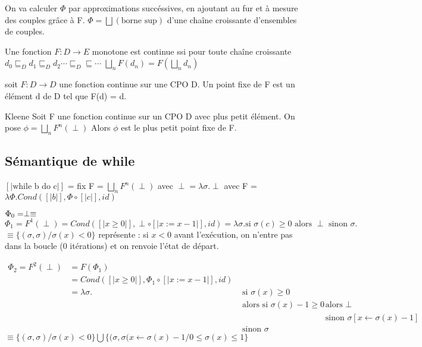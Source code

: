 \documentclass[10pt,a4paper]{article}
\newcommand{\sem}[1]{$\left[| #1 | \right]$}
\newcommand{\semm}[1]{\left[| #1 | \right]}
\begin{document}
On va calculer $\Phi$ par approximations succéssives, en ajoutant au fur et à mesure des couples grâce à F.
$\Phi = \bigsqcup (\text{borne sup})$ d'une chaîne croissante d'ensembles de couples.

\begin{definition}{} Une fonction $F : D \to E$ monotone est continue ssi pour toute chaîne croissante $d_0 \sqsubseteq_D d_1 \sqsubseteq_D d_2 \cdots  \sqsubseteq_D \sqsubseteq \cdots $
$\bigsqcup_n F (d_n) = F( \bigsqcup_n d_n)$
\end{definition}

\begin{definition}{}
 soit $F : D \to D$ une fonction continue sur une CPO D.
 Un point fixe de F est un élément d de D tel que F(d) = d.
\end{definition}

\begin{thm}{Kleene}
 Soit F une fonction continue sur un CPO D avec plus petit élément. On pose 
 $\phi = \bigsqcup_n F^n(\perp)$
Alors $\phi$ est le plus petit point fixe de F.
\end{thm}

\subsection{Sémantique de while}
\sem{\text{while b do c}} = fix F = $\bigsqcup_n F^n(\perp)$ avec $\perp = \lambda \sigma. \perp$
avec F = $\lambda \Phi . Cond( \semm{b}, \Phi \circ \semm{c}, id)$

$\Phi_0 = \perp \equiv \empty$
$\Phi_1 = F^1(\perp) = Cond( \semm{x \geq 0}, \perp \circ \semm{x :=x -1}, id) = \lambda \sigma. \text{si }\sigma(c) \geq 0\text{ alors } \perp \text{ sinon } \sigma.$
$\equiv \{ (\sigma, \sigma) / \sigma(x) < 0 \}$
représente : si $x < 0$ avant l'exécution, on n'entre pas dans la boucle (0 itérations) et on renvoie l'état de départ.

\begin{align*}
\Phi_2 = F^2(\perp) & = F(\Phi_1)\\
		    & = Cond( \semm{x \geq 0}, \Phi_1 \circ \semm{x :=x -1}, id)\\
		    & = \lambda \sigma. &\text{ si }\sigma(x) \geq 0 \\
				       &&\text{  alors si }\sigma(x) -1 \geq 0 &\text{  alors }\perp\\
									&&&\text{  sinon }\sigma[x \leftarrow \sigma(x) -1]\\
					&&\text{  sinon }\sigma
\end{align*}
$\equiv \{(\sigma, \sigma) / \sigma(x) < 0 \} \bigcup \{(\sigma, \sigma(x \leftarrow \sigma(x)-1 / 0 \leq \sigma(x) \leq 1 \}$
\end{document}
